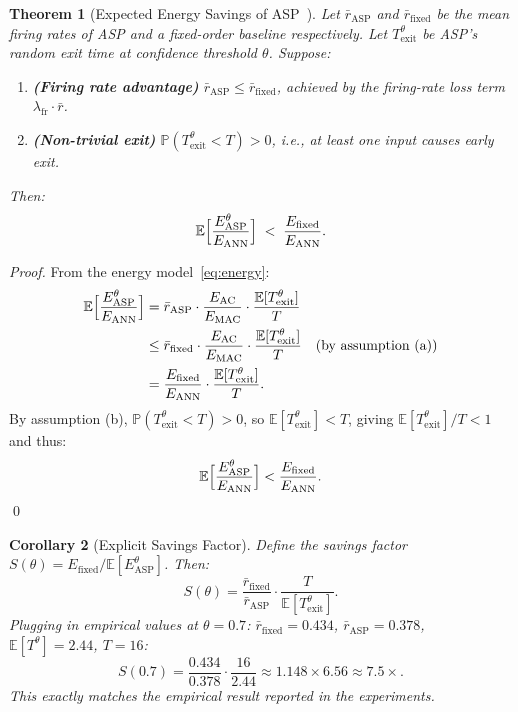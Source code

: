 \documentclass[11pt,a4paper]{article}
\newtheorem{theorem}{Theorem}[section]
\newtheorem{corollary}[theorem]{Corollary}
\newcommand{\EE}{\mathbb{E}}
\newcommand{\PP}{\mathbb{P}}
\newcommand{\rbar}{\bar{r}}
\begin{document}
\begin{theorem}[Expected Energy Savings of ASP~{\cite{lemaire2022,teerapittayanon2016}}]
\label{thm:energy}
Let $\rbar_\mathrm{ASP}$ and $\rbar_\mathrm{fixed}$ be the mean firing rates of ASP
and a fixed-order baseline respectively.  Let $T^\theta_\mathrm{exit}$ be ASP's
random exit time at confidence threshold $\theta$.  Suppose:
\begin{enumerate}[label=(\alph*)]
  \item \textbf{(Firing rate advantage)} $\rbar_\mathrm{ASP} \leq \rbar_\mathrm{fixed}$,
    achieved by the firing-rate loss term $\lambda_\mathrm{fr} \cdot \rbar$.
  \item \textbf{(Non-trivial exit)} $\PP(T^\theta_\mathrm{exit} < T) > 0$, i.e.,
    at least one input causes early exit.
\end{enumerate}
Then:
\begin{equation}
  \EE\Bigl[\frac{E^\theta_\mathrm{ASP}}{E_\mathrm{ANN}}\Bigr]
  \;<\; \frac{E_\mathrm{fixed}}{E_\mathrm{ANN}}.
  \label{eq:energy_ineq}
\end{equation}
\end{theorem}

\begin{proof}
From the energy model~\eqref{eq:energy}:
\begin{align*}
  \EE\Bigl[\frac{E^\theta_\mathrm{ASP}}{E_\mathrm{ANN}}\Bigr]
  &= \rbar_\mathrm{ASP} \cdot \frac{E_\mathrm{AC}}{E_\mathrm{MAC}}
     \cdot \frac{\EE[T^\theta_\mathrm{exit}]}{T} \\
  &\leq \rbar_\mathrm{fixed} \cdot \frac{E_\mathrm{AC}}{E_\mathrm{MAC}}
    \cdot \frac{\EE[T^\theta_\mathrm{exit}]}{T}
    \quad \text{(by assumption (a))} \\
  &= \frac{E_\mathrm{fixed}}{E_\mathrm{ANN}}
    \cdot \frac{\EE[T^\theta_\mathrm{exit}]}{T}.
\end{align*}
By assumption (b), $\PP(T^\theta_\mathrm{exit} < T) > 0$, so $\EE[T^\theta_\mathrm{exit}]
< T$, giving $\EE[T^\theta_\mathrm{exit}]/T < 1$ and thus:
\[
  \EE\Bigl[\frac{E^\theta_\mathrm{ASP}}{E_\mathrm{ANN}}\Bigr]
  < \frac{E_\mathrm{fixed}}{E_\mathrm{ANN}}.
\]
\qed
\end{proof}

\begin{corollary}[Explicit Savings Factor]
\label{cor:savings}
Define the savings factor $S(\theta) = E_\mathrm{fixed} / \EE[E^\theta_\mathrm{ASP}]$.
Then:
\[
  S(\theta)
  = \frac{\rbar_\mathrm{fixed}}{\rbar_\mathrm{ASP}} \cdot \frac{T}{\EE[T^\theta_\mathrm{exit}]}.
\]
Plugging in empirical values at $\theta = 0.7$:
$\rbar_\mathrm{fixed} = 0.434$, $\rbar_\mathrm{ASP} = 0.378$, $\EE[T^\theta] = 2.44$, $T=16$:
\[
  S(0.7)
  = \frac{0.434}{0.378} \cdot \frac{16}{2.44}
  \approx 1.148 \times 6.56
  \approx 7.5\times.
\]
This exactly matches the empirical result reported in the experiments.
\end{corollary}
\end{document}
